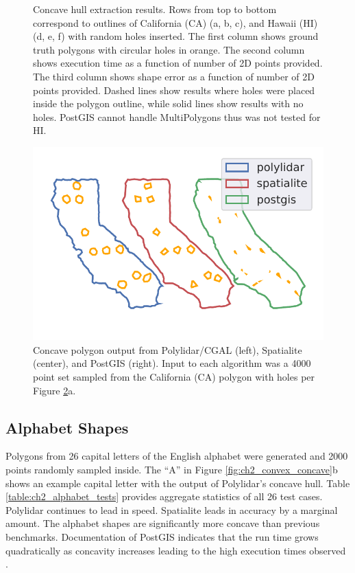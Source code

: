 \begin{figure}[ht]
\begin{subfigure}[t]{.33\linewidth}
    \caption{}
    \label{fig:ch2_hi_acc}
  \end{subfigure}
  \caption[Execution and accuracy results from state shape benchmark]{Concave hull extraction results. Rows from top to bottom correspond to outlines of California (CA) (a, b, c), and Hawaii (HI) (d, e, f) with random holes inserted. The first column shows ground truth polygons with circular holes in orange. The second column shows execution time as a function of number of 2D points provided. The third column shows shape error as a function of number of 2D points provided. Dashed lines show results where holes were placed inside the polygon outline, while solid lines show results with no holes. PostGIS cannot handle MultiPolygons thus was not tested for HI.}
  \label{fig:ch2_compare_algs_all} 
\end{figure}

\begin{figure}[!ht] 
    \centering
      \includegraphics[clip, trim=0.5cm 1.2cm 0.0cm 0.0cm, width=0.35\linewidth]{chapter_2_polylidar/imgs/ouput_ca.pdf}
  \caption[Visual comparison of different polygon extraction methods]{Concave polygon output from Polylidar/CGAL (left), Spatialite (center), and PostGIS (right).  Input to each algorithm was a 4000 point set sampled from the California (CA) polygon with holes per Figure \ref{fig:ch2_compare_algs_all}a.}
  \label{fig:ch2_ca_output} 
\end{figure}





\subsection{Alphabet Shapes}\label{sec:ch2_alphabet_shapes}

Polygons from 26 capital letters of the English alphabet were generated and 2000 points randomly sampled inside.
The ``A'' in Figure \ref{fig:ch2_convex_concave}b shows an example capital letter with the output of Polylidar's concave hull. Table \ref{table:ch2_alphabet_tests} provides aggregate statistics of all 26 test cases. Polylidar continues to lead in speed. Spatialite leads in accuracy by a marginal amount. The alphabet shapes are significantly more concave than previous benchmarks. Documentation of PostGIS indicates that the run time grows quadratically as concavity increases leading to the high execution times observed \cite{open_source_geospatial_foundation_postgis_2019}.

